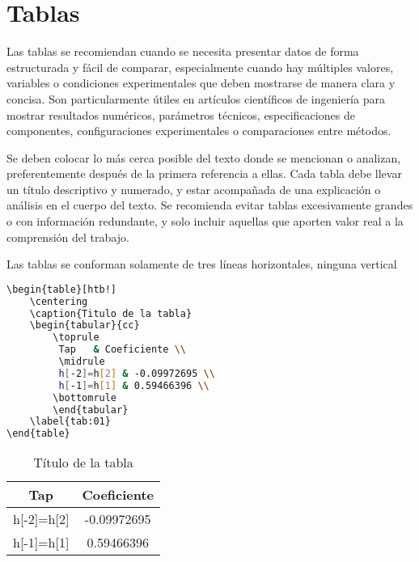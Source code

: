 \documentclass[12pt]{difu100cia} %
\begin{document}
\section{Tablas}

Las tablas se recomiendan cuando se necesita presentar datos de forma estructurada y fácil de comparar, especialmente cuando hay múltiples valores, variables o condiciones experimentales que deben mostrarse de manera clara y concisa. Son particularmente útiles en artículos científicos de ingeniería para mostrar resultados numéricos, parámetros técnicos, especificaciones de componentes, configuraciones experimentales o comparaciones entre métodos.

Se deben colocar lo más cerca posible del texto donde se mencionan o analizan, preferentemente después de la primera referencia a ellas. Cada tabla debe llevar un título descriptivo y numerado, y estar acompañada de una explicación o análisis en el cuerpo del texto. Se recomienda evitar tablas excesivamente grandes o con información redundante, y solo incluir aquellas que aporten valor real a la comprensión del trabajo.

Las tablas se conforman solamente de tres líneas horizontales, ninguna vertical

\begin{lstlisting}[language=bash]
\begin{table}[htb!]
    \centering
    \caption{Titulo de la tabla} 
    \begin{tabular}{cc} 
        \toprule
         Tap   & Coeficiente \\ 
         \midrule
         h[-2]=h[2] & -0.09972695 \\
         h[-1]=h[1] & 0.59466396 \\
        \bottomrule
        \end{tabular}
    \label{tab:01}
\end{table}
\end{lstlisting}

\begin{table}[htb!]
    \centering
    \caption{Título de la tabla} 
    \begin{tabular}{cc} 
        \toprule
         Tap   & Coeficiente \\ 
         \midrule
         h[-2]=h[2] & -0.09972695 \\
         h[-1]=h[1] & 0.59466396 \\
        \bottomrule
        \end{tabular}
    \label{tab:01}
\end{table}
\end{document}
